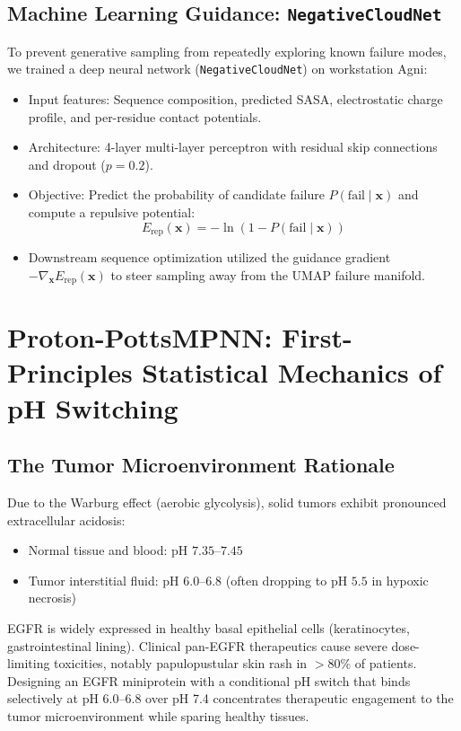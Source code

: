 \documentclass[11pt]{article}
\begin{document}
\subsection{Machine Learning Guidance: \texttt{NegativeCloudNet}}
To prevent generative sampling from repeatedly exploring known failure modes, we trained a deep neural network (\texttt{NegativeCloudNet}) on workstation Agni:
\begin{itemize}
    \item Input features: Sequence composition, predicted SASA, electrostatic charge profile, and per-residue contact potentials.
    \item Architecture: 4-layer multi-layer perceptron with residual skip connections and dropout ($p=0.2$).
    \item Objective: Predict the probability of candidate failure $P(\text{fail} \mid \mathbf{x})$ and compute a repulsive potential:
    \begin{equation}
        E_{\text{rep}}(\mathbf{x}) = -\ln\left(1 - P(\text{fail} \mid \mathbf{x})\right)
    \end{equation}
    \item Downstream sequence optimization utilized the guidance gradient $-\nabla_{\mathbf{x}} E_{\text{rep}}(\mathbf{x})$ to steer sampling away from the UMAP failure manifold.
\end{itemize}

\section{Proton-PottsMPNN: First-Principles Statistical Mechanics of pH Switching}

\subsection{The Tumor Microenvironment Rationale}
Due to the Warburg effect (aerobic glycolysis), solid tumors exhibit pronounced extracellular acidosis:
\begin{itemize}
    \item Normal tissue and blood: $\text{pH } 7.35\text{--}7.45$
    \item Tumor interstitial fluid: $\text{pH } 6.0\text{--}6.8$ (often dropping to $\text{pH } 5.5$ in hypoxic necrosis)
\end{itemize}
EGFR is widely expressed in healthy basal epithelial cells (keratinocytes, gastrointestinal lining). Clinical pan-EGFR therapeutics cause severe dose-limiting toxicities, notably papulopustular skin rash in $>80\%$ of patients. Designing an EGFR miniprotein with a conditional pH switch that binds selectively at pH 6.0--6.8 over pH 7.4 concentrates therapeutic engagement to the tumor microenvironment while sparing healthy tissues.
\end{document}
